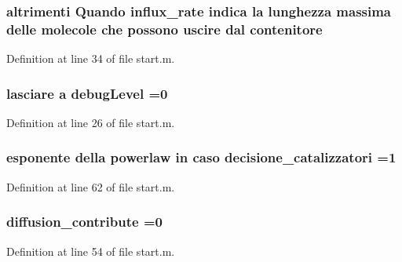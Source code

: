 \hypertarget{a00113_a8fcf98921930aa3720acdd081c5b0c2f}{
\subsubsection[{contenitore}]{\setlength{\rightskip}{0pt plus 5cm}altrimenti Quando {\bf influx\-\_\-rate} indica la {\bf lunghezza} massima delle molecole che possono uscire dal contenitore}}\label{a00113_a8fcf98921930aa3720acdd081c5b0c2f}


Definition at line 34 of file start.\-m.

\hypertarget{a00113_a08ef28bc85447e904ca9ea64de89b676}{
\subsubsection[{debug\-Level}]{\setlength{\rightskip}{0pt plus 5cm}lasciare {\bf a} debug\-Level =0}}\label{a00113_a08ef28bc85447e904ca9ea64de89b676}


Definition at line 26 of file start.\-m.

\hypertarget{a00113_a78948f867453293fcff0835b1bb05b8c}{
\subsubsection[{decisione\-\_\-catalizzatori}]{\setlength{\rightskip}{0pt plus 5cm}esponente della powerlaw in caso decisione\-\_\-catalizzatori =1}}\label{a00113_a78948f867453293fcff0835b1bb05b8c}


Definition at line 62 of file start.\-m.

\hypertarget{a00113_a9341167cb56ed18499df723220990b9c}{
\subsubsection[{diffusion\-\_\-contribute}]{\setlength{\rightskip}{0pt plus 5cm}diffusion\-\_\-contribute =0}}\label{a00113_a9341167cb56ed18499df723220990b9c}


Definition at line 54 of file start.\-m.

